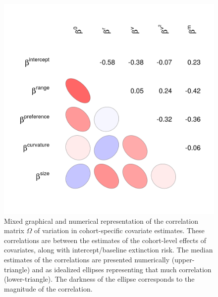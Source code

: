 \documentclass[11pt]{article}
\begin{document}
\begin{figure}[ht]
  \centering
  \includegraphics[height = 0.8\textheight,width=\textwidth,keepaspectratio=true]{figure/wei_cor_heatmap_cweib_base}
  \caption{Mixed graphical and numerical representation of the correlation matrix \(\Omega\) of variation in cohort-specific covariate estimates. These correlations are between the estimates of the cohort-level effects of covariates, along with intercept/baseline extinction risk. The median estimates of the correlations are presented numerically (upper-triangle) and as idealized ellipses representing that much correlation (lower-triangle). The darkness of the ellipse corresponds to the magnitude of the correlation.}
  \label{fig:cor_posterior}
\end{figure}
\end{document}
